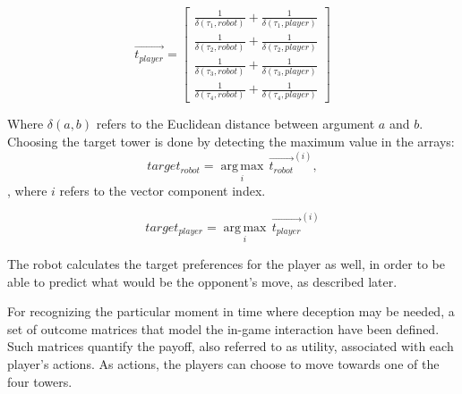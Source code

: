 \begin{equation}
\overrightarrow{t_{player}} = \begin{bmatrix}
\frac{1}{\delta(\tau_{1},robot)} + \frac{1}{\delta(\tau_{1},player)} \\ 
\frac{1}{\delta(\tau_{2},robot)} + \frac{1}{\delta(\tau_{2},player)}  \\
\frac{1}{\delta(\tau_{3},robot)} + \frac{1}{\delta(\tau_{3},player)}  \\
\frac{1}{\delta(\tau_{4},robot)} + \frac{1}{\delta(\tau_{4},player)} 
\end{bmatrix}
\label{eq:array2}
\end{equation}

Where $\delta(a,b)$ refers to the Euclidean distance between argument $a$ and $b$. Choosing the target tower is done by detecting the maximum value in the arrays:
\begin{equation}
target_{robot} = \operatorname*{arg\,max}_i \, \overrightarrow{t_{robot}}^{(i)}, 
\end{equation}, where $i$ refers to the vector component index.

\begin{equation}
target_{player} = \operatorname*{arg\,max}_i \, \overrightarrow{t_{player}}^{(i)}
\end{equation}

The robot calculates the target preferences for the player as well, in order to be able to predict what would be the opponent's move, as described later.

For recognizing the particular moment in time where deception may be needed, a set of outcome matrices that model the in-game interaction have been defined. Such matrices quantify the payoff, also referred to as utility, associated with each player's actions. As actions, the players can choose to move towards one of the four towers. 

